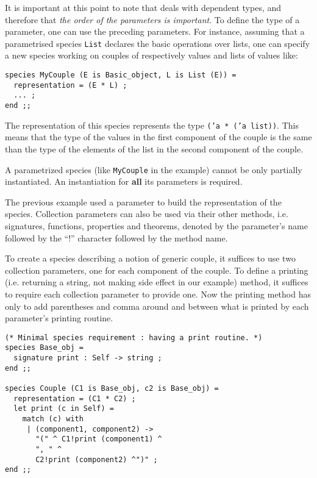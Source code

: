 \smallskip It is important at this point to note that {\focal} deals with
dependent types, and therefore that {\em
  the order of the parameters is important}. To define the type of a
parameter, one can use the preceding parameters. For instance,
assuming that a parametrised species {\tt List}
declares the basic operations over lists, one can specify a new
species working on couples of respectively values and lists of values
like: {\scriptsize
\begin{lstlisting}
species MyCouple (E is Basic_object, L is List (E)) =
  representation = (E * L) ;
  ... ;
end ;;
\end{lstlisting}
}

The representation of this species represents the type
{\tt ('a * ('a list))}. This means that the type of the values in the
first component of the couple is the same than the type of the
elements of the list in the second component of the couple.


A parametrized species (like {\tt MyCouple} in the example) cannot be only
partially instantiated. An instantiation for {\bf all} its parameters is
required.


\medskip
\label{method-qualification}
The previous example  used a parameter to build the representation of the
species.
Collection parameters can also be used via their other methods,
i.e. signatures, functions, properties and theorems, denoted by the
parameter's name followed by  the ``!''
character followed by the method name.

To create a species describing a notion of generic couple, it suffices
to use two collection parameters, one for each component of the
couple. To define a printing (i.e. returning a string, not making side
effect in our example) method, it suffices to require each collection
parameter to provide one. Now the printing method has only to
add parentheses and comma around and between what is printed by each
parameter's printing routine.
{\scriptsize
\begin{lstlisting}
(* Minimal species requirement : having a print routine. *)
species Base_obj =
  signature print : Self -> string ;
end ;;

species Couple (C1 is Base_obj, c2 is Base_obj) =
  representation = (C1 * C2) ;
  let print (c in Self) =
    match (c) with
     | (component1, component2) ->
       "(" ^ C1!print (component1) ^
       ", " ^
       C2!print (component2) ^")" ;
end ;;
\end{lstlisting}
}

